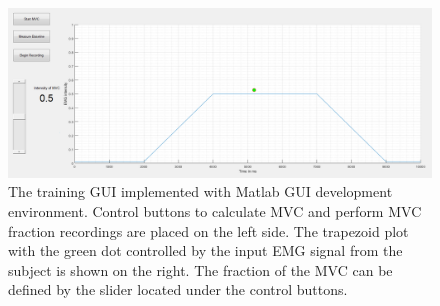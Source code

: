 \begin{figure}[H] \label{fig:GUI_Training}
	\includegraphics[width=1\textwidth]{figures/GUI/GUI_Training.png}
	\caption{The training GUI implemented with Matlab GUI development environment. Control buttons to calculate MVC and perform MVC fraction recordings are placed on the left side. The trapezoid plot with the green dot controlled by the input EMG signal from the subject is shown on the right. The fraction of the MVC can be defined by the slider located under the control buttons.}
	\label{fig:GUI_Training}
\end{figure} 


